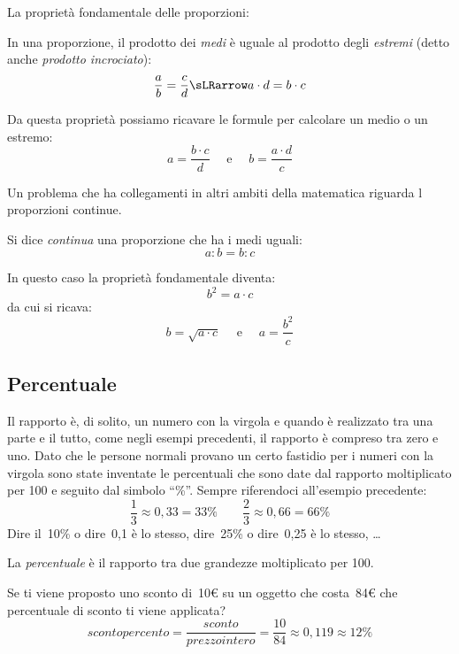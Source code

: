 La proprietà fondamentale delle proporzioni:

\begin{teorema}
 In una proporzione, il prodotto dei \emph{medi} è uguale al prodotto 
degli \emph{estremi} (detto anche \emph{prodotto incrociato}):
\[\dfrac{a}{b} = \dfrac{c}{d} \sLRarrow a \cdot d = b \cdot c\]
\end{teorema}

Da questa proprietà possiamo ricavare le formule per calcolare un medio o 
un estremo:
\[a = \frac{b \cdot c}{d} \quad \text{ e } \quad 
  b = \frac{a \cdot d}{c}\]
  
Un problema che ha collegamenti in altri ambiti della matematica riguarda l 
proporzioni continue.

\begin{definizione}
 Si dice \emph{continua} una proporzione che ha i medi uguali:
 \[a : b = b : c\]
\end{definizione}

In questo caso la proprietà fondamentale diventa:
\[b^2 = a \cdot c\]
da cui si ricava:
\[b = \sqrt{a \cdot c} \quad \text{ e } \quad a = \frac{b^2}{c}\]

\subsection{Percentuale}

Il rapporto è, di solito, un numero con la virgola e 
quando è realizzato tra una parte e il tutto, come negli esempi precedenti, 
il rapporto è compreso tra zero e uno. Dato che le persone normali provano 
un certo fastidio per i numeri con la virgola sono state inventate le 
percentuali che sono date dal rapporto moltiplicato per 100 e seguito dal 
simbolo ``\%''. Sempre riferendoci all'esempio precedente:
\[\frac{1}{3} \approx 0,33 = 33\% \qquad 
  \frac{2}{3} \approx 0,66 = 66\%\]
Dire il~10\% o dire~0,1 è lo stesso, 
dire~25\% o dire~0,25 è lo stesso, \dots

\begin{definizione}
 La \emph{percentuale} è il rapporto tra due grandezze moltiplicato per 100.
\end{definizione}

\begin{esempio}
 Se ti viene proposto uno sconto di~10€ su un oggetto che costa~84€ che 
percentuale di sconto ti viene applicata?
\[sconto percento = \frac{sconto}{prezzointero}=\frac{10}{84} \approx
  0,119 \approx 12\%\]
\end{esempio}

